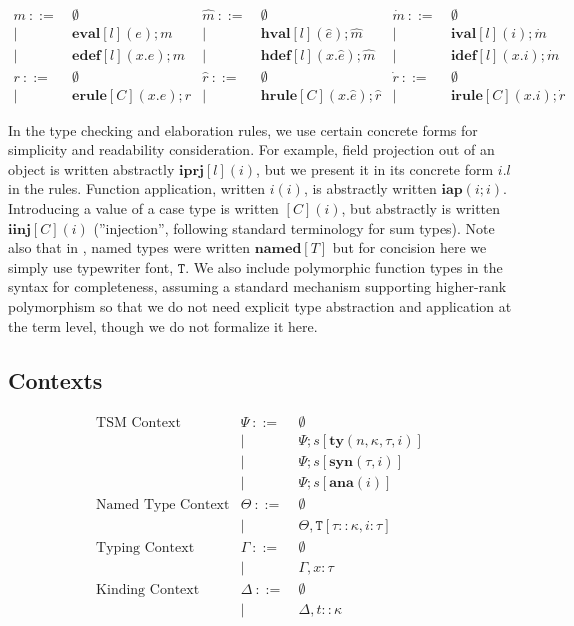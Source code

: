 \documentclass{sig-alternate}
\newcommand{\T}{\mathtt{T}}
\begin{document}
\[\begin{array}{rlrlrl}
  m       ~::=&~ \emptyset            &\hat{m}  ~::=&~ \emptyset                &\dot{m}  ~::=&~ \emptyset\\
        | ~ &~ \mathbf{eval}[l](e);m      &     | ~ &~ \mathbf{hval}[l](\hat{e});\hat{m}    &     | ~ &~ \mathbf{ival}[l](i);\dot{m}\\
        | ~ &~ \mathbf{edef}[l](x.e);m      &     | ~ &~ \mathbf{hdef}[l](x.\hat{e});\hat{m}    &     | ~ &~ \mathbf{idef}[l](x.i);\dot{m}\\
  r       ~::=&~ \emptyset            &\hat{r}  ~::=&~ \emptyset                &\dot{r}  ~::=&~ \emptyset\\
        | ~ &~ \mathbf{erule}[C](x.e);r     &       | ~ &~ \mathbf{hrule}[C](x.\hat{e});\hat{r}   &     | ~ &~ \mathbf{irule}[C](x.i);\dot{r}
\end{array}
\]


In the type checking and elaboration rules, we use certain concrete forms for simplicity and readability consideration. For example, field projection out of an object is written abstractly $\mathbf{iprj}[l](i)$, but we present it in its concrete form $i.l$ in the rules. Function application, written $i(i)$, is abstractly written $\mathbf{iap}(i;i)$. Introducing a value of a case type is written $[C](i)$, but abstractly is written $\mathbf{iinj}[C](i)$ (''injection'', following standard terminology for sum types). Note also that in \cite{TSLs},  named types were written $\mathbf{named}[T]$ but for concision here we simply use typewriter font, $\mathtt{T}$. We also include polymorphic function types in the syntax for completeness, assuming a standard mechanism supporting higher-rank polymorphism so that we do not need explicit type abstraction and application at the term level, though we do not formalize it here.

\subsection{Contexts}
\[
\begin{array}{rrl}
\text{TSM Context}  & \Psi  ~::=&~  \emptyset\\
            &     | ~ &~  \Psi;s[\mathbf{ty}(n,\kappa,\tau,i)]\\
            &     | ~ &~  \Psi;s[\mathbf{syn}(\tau,i)]\\
            &     | ~ &~  \Psi;s[\mathbf{ana}(i)]\\
\text{Named Type Context}   & \Theta  ~::=&~ \emptyset\\
            &     | ~ &~ \Theta,\T[\tau::\kappa,i:\tau] \\
\text{Typing Context} & \Gamma  ~::=&~ \emptyset\\
            &     | ~ &~ \Gamma,x:\tau\\
\text{Kinding Context}  &   \Delta  ~::=&~ \emptyset\\
            &       | ~ &~ \Delta,t::\kappa\\
\end{array}
\]
\end{document}
